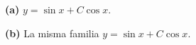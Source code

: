\noindent\textbf{(a)} $y=\sin x+C\cos x$.

\noindent\textbf{(b)} La misma familia $y=\sin x+C\cos x$.
